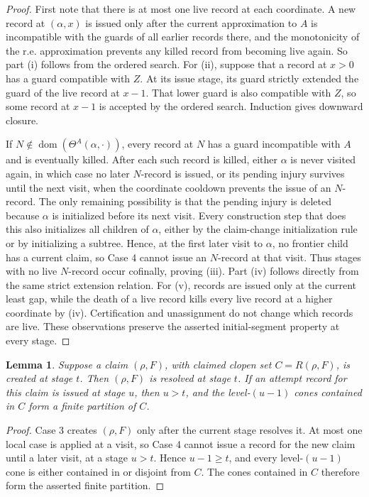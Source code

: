 \documentclass[10pt,a4paper]{amsart}
\newtheorem{lemma}[theorem]{Lemma}
\begin{document}
\begin{proof}
First note that there is at most one live record at each coordinate. A new
record at $(\alpha,x)$ is issued only after the current approximation to $A$
is incompatible with the guards of all earlier records there, and the
monotonicity of the r.e. approximation prevents any killed record from
becoming live again.
So part (i) follows from the ordered search. For (ii), suppose that a record at
$x>0$ has a guard compatible with $Z$. At its issue stage, its guard strictly
extended the guard of the live record at $x-1$. That lower guard is also
compatible with $Z$, so some record at $x-1$ is accepted by the ordered
search. Induction gives downward closure.

If $N\notin\operatorname{dom}(\Theta^A(\alpha,\cdot))$, every record at $N$
has a guard incompatible with $A$ and is eventually killed. After each such
record is killed, either $\alpha$ is never visited again, in which case no
later $N$-record is issued, or its pending injury survives until the next
visit, when the coordinate cooldown prevents the issue of an $N$-record. The
only remaining possibility is that the pending injury is deleted because
$\alpha$ is initialized before its next visit. Every construction step that
does this also initializes all children of $\alpha$, either by the
claim-change initialization rule or by initializing a subtree. Hence, at the
first later visit to $\alpha$, no frontier child has a current claim, so Case
4 cannot issue an $N$-record at that visit. Thus stages with no live
$N$-record occur cofinally, proving (iii).
Part (iv) follows directly from the same strict extension relation. For (v),
records are issued only at the current least gap, while the death of a live
record kills every live record at a higher coordinate by (iv). Certification
and unassignment do not change which records are live. These observations
preserve the asserted initial-segment property at every stage.
\end{proof}

\begin{lemma}\label{low2:resolution}
Suppose a claim $(\rho,F)$, with claimed clopen set $C=R(\rho,F)$, is created
at stage $t$. Then $(\rho,F)$ is resolved at stage $t$. If an attempt record
for this claim is issued at stage $u$, then $u>t$, and the level-$(u-1)$ cones
contained in $C$ form a finite partition of $C$.
\end{lemma}

\begin{proof}
Case 3 creates $(\rho,F)$ only after the current stage resolves it. At most
one local case is applied at a visit, so Case 4 cannot issue a record for the
new claim until a later visit, at a stage $u>t$. Hence $u-1\geq t$, and every
level-$(u-1)$ cone is either contained in or disjoint from $C$. The cones
contained in $C$ therefore form the asserted finite partition.
\end{proof}
\end{document}
